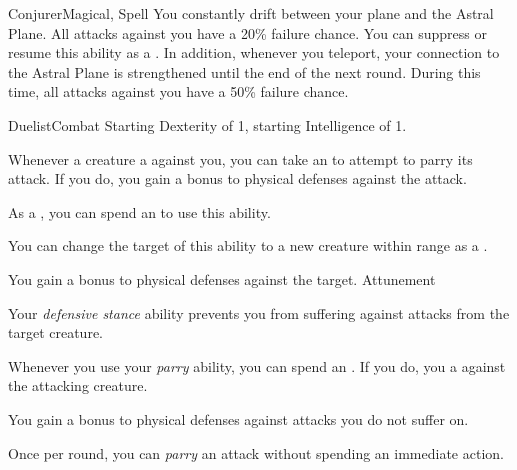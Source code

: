 \begin{feat}{Conjurer}{Magical, Spell}
         You constantly drift between your plane and the Astral Plane.
        All attacks against you have a 20\% failure chance.
        You can suppress or resume this ability as a .
        In addition, whenever you teleport, your connection to the Astral Plane is strengthened until the end of the next round.
        During this time, all attacks against you have a 50\% failure chance.
    \end{feat}

    \begin{feat}{Duelist}{Combat}
        \featpre Starting Dexterity of 1, starting Intelligence of 1.
        \featben

         Whenever a creature  a  against you, you can take an  to attempt to parry its attack.
        If you do, you gain a  bonus to physical defenses against the attack.

         As a , you can spend an  to use this ability.
        \begin{ability}
            \begin{spelltargetinginfo}
                \spellspecial You can change the target of this ability to a new creature within range as a .
            \end{spelltargetinginfo}
            \begin{spelleffects}
                \spelleffect You gain a  bonus to physical defenses against the target.
                \spelldur Attunement
            \end{spelleffects}
        \end{ability}

        \ff[4]{} 

         Your \textit{defensive stance} ability prevents you from suffering  against attacks from the target creature.

         Whenever you use your \textit{parry} ability, you can spend an .
        If you do, you  a  against the attacking creature.

         You gain a  bonus to physical defenses against attacks you do not suffer  on.

         Once per round, you can \textit{parry} an attack without spending an immediate action.
    \end{feat}

